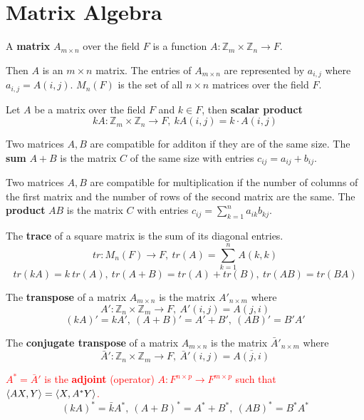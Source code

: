 \chapter{Matrix Algebra}
\begin{definition}
	A \textbf{matrix} $A_{m \times n}$ over the field $F$ is a function $A : \mathbb{Z}_m \times \mathbb{Z}_n \to F$.
\end{definition}
	Then $A$ is an $m \times n$ matrix.
	The entries of $A_{m \times n}$ are represented by $a_{i,j}$ where $a_{i,j} = A(i,j)$.
	$M_n(F)$ is the set of all $n \times n$ matrices over the field $F$.

\begin{definition}
	Let $A$ be a matrix over the field $F$ and $k \in F$, then \textbf{scalar product}
	$$kA : \mathbb{Z}_m \times \mathbb{Z}_n \to F,\ kA(i,j) = k \cdot A(i,j)$$
\end{definition}

\begin{definition}
	Two matrices $A,B$ are compatible for additon if they are of the same size.
	The \textbf{sum} $A+B$ is the matrix $C$ of the same size with entries $c_{ij} = a_{ij} + b_{ij}$.
\end{definition}

\begin{definition}
	Two matrices $A,B$ are compatible for multiplication if the number of columns of the first matrix and the number of rows of the second matrix are the same.
	The \textbf{product} $AB$ is the matrix $C$ with entries
	$ c_{ij} = \sum_{k=1}^n a_{ik}b_{kj}$.
\end{definition}

\begin{definition}
	The \textbf{trace} of a square matrix is the sum of its diagonal entries.
	$$ tr : M_n(F) \to F,\ tr(A) = \sum_{k=1}^n A(k,k) $$
	$$tr(kA) = k\ tr(A),\ tr(A+B) = tr(A) + tr(B),\ tr(AB) = tr(BA)$$
\end{definition}

\begin{definition}
	The \textbf{transpose} of a matrix $A_{m \times n}$ is the matrix $A'_{n \times m}$ where
		$$A' : \mathbb{Z}_n \times \mathbb{Z}_m \to F,\ A'(i,j) = A(j,i)$$
		$$(kA)'=kA',\ (A+B)'=A'+B',\ (AB)'=B'A'$$
\end{definition}

\begin{definition}
	The \textbf{conjugate transpose} of a matrix $A_{m \times n}$ is the matrix $\bar{A}'_{n \times m}$ where
		$$\bar{A}' : \mathbb{Z}_n \times \mathbb{Z}_m \to F,\ \bar{A}'(i,j) = \overline{A(j,i)}$$
\end{definition}
	\textcolor{red}{$A^\ast = \bar{A}'$ is the \textbf{adjoint} (operator) $A : F^{n \times p} \to F^{m \times p}$ such that $\left\langle AX,Y \right\rangle = \left\langle X,A^\ast Y \right\rangle$.}
	$$(kA)^\ast = \bar{k}A^\ast,\ (A+B)^\ast = A^\ast + B^\ast,\ (AB)^\ast = B^\ast A^\ast$$

